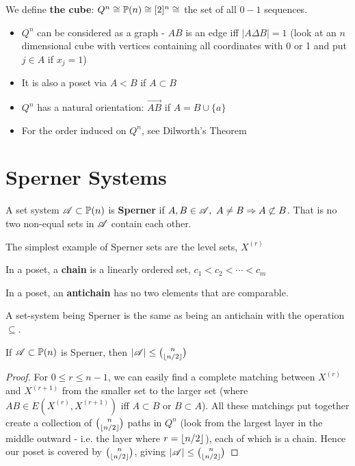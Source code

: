 \documentclass[a4paper]{article}
\begin{document}
{\begin{defi}
	We define \textbf{the cube}: $Q^n\cong\P(n)\cong[2]^n\cong$ the set of all $0-1$ sequences.
\end{defi}
\begin{rem}
	\begin{itemize}
		\item $Q^n$ can be considered as a graph - $AB$ is an edge iff $|A\Delta B|=1$ (look at an $n$ dimensional cube with vertices containing all coordinates with 0 or 1 and put $j\in A$ if $x_j=1$)\\
		\item It is also a poset via $A<B$ if $A\subset B$
		\item $Q^n$ has a natural orientation: $\overrightarrow{AB}$ if $A=B\cup\{a\}$
		\item For the order induced on $Q^n$, see Dilworth's Theorem
	\end{itemize}
\end{rem}

\section{Sperner Systems}
\begin{defi}[Sperner]
	A set system $\A\subset\P(n)$ is \textbf{Sperner} if $A,B\in\A,\ A\neq B\Rightarrow A\not\subset B$. That is no two non-equal sets in $\A$ contain each other.
\end{defi}

The simplest example of Sperner sets are the level sets, $X^{(r)}$

\begin{defi}[Chain]
	In a poset, a \textbf{chain} is a linearly ordered set, $c_1<c_2<\cdots<c_m$
\end{defi}

\begin{defi}[Antichain]
	In a poset, an \textbf{antichain} has no two elements that are comparable.
\end{defi}

A set-system being Sperner is the same as being an antichain with the operation $\subseteq$.

\begin{thm-num}[Sperner, 1928]
	If $\A\subset\P(n)$ is Sperner, then $|\A|\leq\binom{n}{\lf n/2\rf}$
\end{thm-num}
\begin{proof}
	For $0\leq r\leq n-1$, we can easily find a complete matching between $X^{(r)}$ and $X^{(r+1)}$ from the smaller set to the larger set (where $AB\in E\left(X^{(r)},X^{(r+1)}\right)$ iff $A\subset B$ or $B\subset A$). All these matchings put together create a collection of $\binom{n}{\lf n/2\rf}$ paths in $Q^n$ (look from the largest layer in the middle outward - i.e. the layer where $r=\lf n/2\rf$), each of which is a chain. Hence our poset is covered by $\binom{n}{\lf n/2\rf}$, giving $|\A|\leq\binom{n}{\lf n/2\rf}$
\end{proof}}
\end{document}
